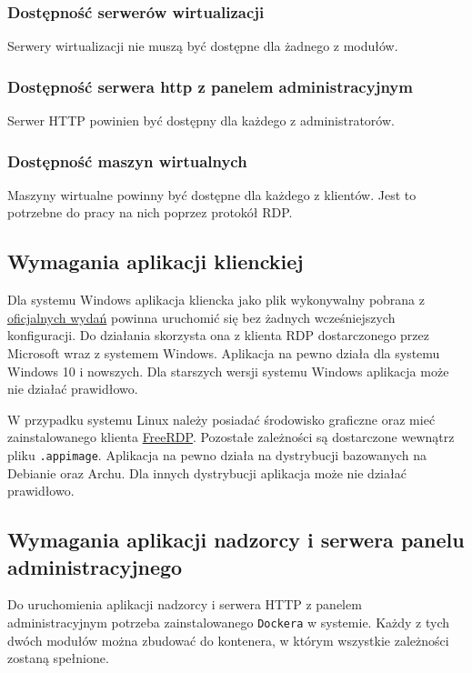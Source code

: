 \documentclass[../opis-rozwiazania.tex]{subfiles}
\begin{document}
\subsubsection{Dostępność serwerów wirtualizacji}
Serwery wirtualizacji nie muszą być dostępne dla żadnego z modułów.

\subsubsection{Dostępność serwera http z panelem administracyjnym}
Serwer HTTP powinien być dostępny dla każdego z administratorów.

\subsubsection{Dostępność maszyn wirtualnych}
Maszyny wirtualne powinny być dostępne dla każdego z klientów.
Jest to potrzebne do pracy na nich poprzez protokół RDP.

\subsection{Wymagania aplikacji klienckiej}
Dla systemu Windows aplikacja kliencka jako plik wykonywalny pobrana z \href{https://github.com/one-click-desktop/client/releases}{oficjalnych wydań} powinna uruchomić się bez żadnych wcześniejszych konfiguracji.
Do działania skorzysta ona z klienta RDP dostarczonego przez Microsoft wraz z systemem Windows.
Aplikacja na pewno działa dla systemu Windows 10 i nowszych.
Dla starszych wersji systemu Windows aplikacja może nie działać prawidłowo.

W przypadku systemu Linux należy posiadać środowisko graficzne oraz mieć zainstalowanego klienta \href{https://www.freerdp.com/}{FreeRDP}.
Pozostałe zależności są dostarczone wewnątrz pliku \texttt{.appimage}.
Aplikacja na pewno działa na dystrybucji bazowanych na Debianie oraz Archu.
Dla innych dystrybucji aplikacja może nie działać prawidłowo.

\subsection {Wymagania aplikacji nadzorcy i serwera panelu administracyjnego}
Do uruchomienia aplikacji nadzorcy i serwera HTTP z panelem administracyjnym potrzeba zainstalowanego \texttt{Dockera} w systemie.
Każdy z tych dwóch modułów można zbudować do kontenera, w którym wszystkie zależności zostaną spełnione.
\end{document}
